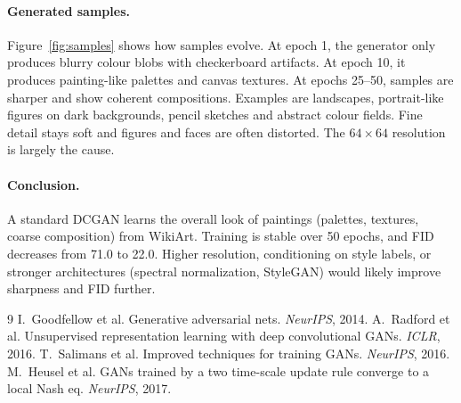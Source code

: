 \documentclass{article}
\begin{document}
\paragraph{Generated samples.} Figure~\ref{fig:samples} shows how samples evolve. At epoch 1, the generator only produces blurry colour blobs with checkerboard artifacts. At epoch 10, it produces painting-like palettes and canvas textures. At epochs 25--50, samples are sharper and show coherent compositions. Examples are landscapes, portrait-like figures on dark backgrounds, pencil sketches and abstract colour fields. Fine detail stays soft and figures and faces are often distorted. The $64\times64$ resolution is largely the cause.


\paragraph{Conclusion.}
A standard DCGAN learns the overall look of paintings (palettes, textures, coarse composition) from WikiArt. Training is stable over 50 epochs, and FID decreases from 71.0 to 22.0. Higher resolution, conditioning on style labels, or stronger architectures (spectral normalization, StyleGAN) would likely improve sharpness and FID further.

\vspace{-6pt}
{\footnotesize
\begin{thebibliography}{9}\setlength{\itemsep}{0pt}
 I.~Goodfellow et al. Generative adversarial nets. \emph{NeurIPS}, 2014.
 A.~Radford et al. Unsupervised representation learning with deep convolutional GANs. \emph{ICLR}, 2016.
 T.~Salimans et al. Improved techniques for training GANs. \emph{NeurIPS}, 2016.
 M.~Heusel et al. GANs trained by a two time-scale update rule converge to a local Nash eq. \emph{NeurIPS}, 2017.
\end{thebibliography}}
\end{document}
